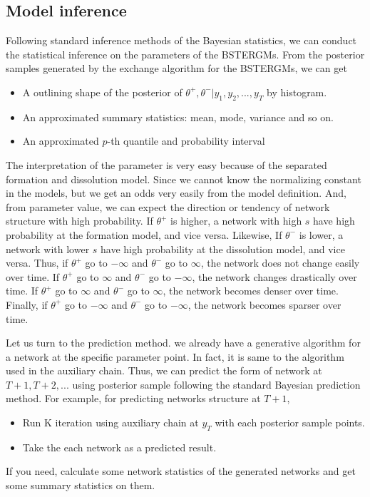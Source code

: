 \documentclass[aspectratio=169,ignorenonframetext,9pt]{beamer}
\theoremstyle{plain}
\theoremstyle{definition}
\begin{document}
\subsection{Model inference}

Following standard inference methods of the Bayesian statistics,
we can conduct the statistical inference on the parameters of the BSTERGMs.
From the posterior samples generated by the exchange algorithm for the BSTERGMs, we can get
\begin{itemize}
    \item A outlining shape of the posterior of $\theta^+,\theta^-|y_1,y_2,...,y_T$ by histogram.
    \item An approximated summary statistics: mean, mode, variance and so on.
    \item An approximated $p$-th quantile and probability interval
\end{itemize}

The interpretation of the parameter is very easy because of the separated formation and dissolution model.
Since we cannot know the normalizing constant in the models, but we get an odds very easily from the model definition.
And, from parameter value, we can expect the direction or tendency of network structure with high probability.
If $\theta^+$ is higher, a network with high $s$ have high probability at the formation model, and vice versa.
Likewise, If $\theta^-$ is lower, a network with lower $s$ have high probability at the dissolution model, and vice versa.
Thus, if $\theta^+$ go to $-\infty$ and $\theta^-$ go to $\infty$, the network does not change easily over time.
If $\theta^+$ go to $\infty$ and $\theta^-$ go to $-\infty$, the network changes drastically over time.
If $\theta^+$ go to $\infty$ and $\theta^-$ go to $\infty$, the network becomes denser over time.
Finally, if $\theta^+$ go to $-\infty$ and $\theta^-$ go to $-\infty$, the network becomes sparser over time.

Let us turn to the prediction method. 
we already have a generative algorithm for a network at the specific parameter point.
In fact, it is same to the algorithm used in the auxiliary chain.
Thus, we can predict the form of network at $T+1,T+2,...$ using posterior sample following the standard Bayesian prediction method.
For example, for predicting networks structure at $T+1$,
\begin{itemize}
    \item Run K iteration using auxiliary chain at $y_T$ with each posterior sample points.
    \item Take the each network as a predicted result.
\end{itemize}
If you need, calculate some network statistics of the generated networks and get some summary statistics on them.
\end{document}

